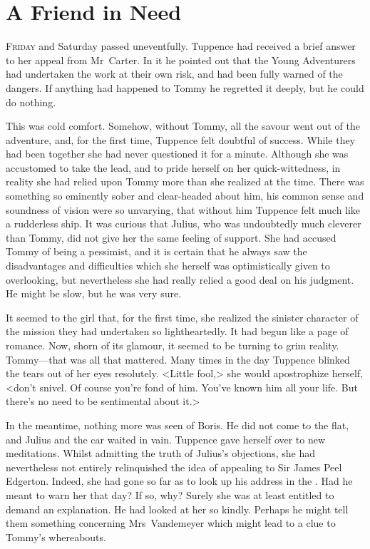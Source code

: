\chapter{A Friend in Need} 

 \lettrine{F}{riday} and Saturday passed uneventfully. Tuppence had received a brief answer to her appeal from Mr~Carter. In it he pointed out that the Young Adventurers had undertaken the work at their own risk, and had been fully warned of the dangers. If anything had happened to Tommy he regretted it deeply, but he could do nothing.

This was cold comfort. Somehow, without Tommy, all the savour went out of the adventure, and, for the first time, Tuppence felt doubtful of success. While they had been together she had never questioned it for a minute. Although she was accustomed to take the lead, and to pride herself on her quick-wittedness, in reality she had relied upon Tommy more than she realized at the time. There was something so eminently sober and clear-headed about him, his common sense and soundness of vision were so unvarying, that without him Tuppence felt much like a rudderless ship. It was curious that Julius, who was undoubtedly much cleverer than Tommy, did not give her the same feeling of support. She had accused Tommy of being a pessimist, and it is certain that he always saw the disadvantages and difficulties which she herself was optimistically given to overlooking, but nevertheless she had really relied a good deal on his judgment. He might be slow, but he was very sure.

It seemed to the girl that, for the first time, she realized the sinister character of the mission they had undertaken so lightheartedly. It had begun like a page of romance. Now, shorn of its glamour, it seemed to be turning to grim reality. Tommy—that was all that mattered. Many times in the day Tuppence blinked the tears out of her eyes resolutely. <Little fool,> she would apostrophize herself, <don't snivel. Of course you're fond of him. You've known him all your life. But there's no need to be sentimental about it.>

In the meantime, nothing more was seen of Boris. He did not come to the flat, and Julius and the car waited in vain. Tuppence gave herself over to new meditations. Whilst admitting the truth of Julius's objections, she had nevertheless not entirely relinquished the idea of appealing to Sir James Peel Edgerton. Indeed, she had gone so far as to look up his address in the . Had he meant to warn her that day? If so, why? Surely she was at least entitled to demand an explanation. He had looked at her so kindly. Perhaps he might tell them something concerning Mrs~Vandemeyer which might lead to a clue to Tommy's whereabouts.

